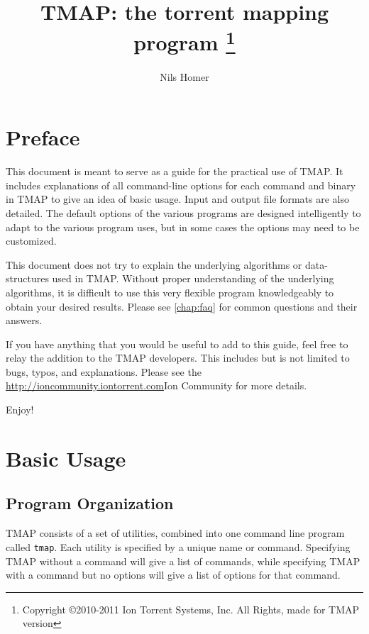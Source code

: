 \documentclass[a4paper,12pt]{book}
\author{Nils Homer}
\date{}
\title{TMAP: the torrent mapping program
\thanks{Copyright \copyright 2010-2011 Ion Torrent Systems, Inc. All Rights, made for TMAP version \Version}
}
\newcommand{\TT}[1]{{\tt #1}} %
\begin{document}
\frontmatter

\maketitle

\dominitoc
\tableofcontents
{}


\chapter{Preface}
This document is meant to serve as a guide for the practical use of TMAP.
It includes explanations of all command-line options for each command and binary in TMAP to give an idea of basic usage.
Input and output file formats are also detailed.
The default options of the various programs are designed intelligently to adapt to the various program uses, but in some cases the options may need to be customized.

This document does not try to explain the underlying algorithms or data-structures used in TMAP.
Without proper understanding of the underlying algorithms, it is difficult to use this very flexible program knowledgeably to obtain your desired results.
Please see \autoref{chap:faq} for common questions and their answers.

If you have anything that you would be useful to add to this guide, feel free to relay the addition to the TMAP developers.
This includes but is not limited to bugs, typos, and explanations.
Please see the \url{http://ioncommunity.iontorrent.com}{Ion Community} for more details.

Enjoy!

\mainmatter

\chapter{Basic Usage}

\section{Program Organization}
TMAP consists of a set of utilities, combined into one command line program called \TT{tmap}.  
Each utility is specified by a unique name or command.
Specifying TMAP without a command will give a list of commands, while specifying TMAP with a command but no options will give a list of options for that command.
\end{document}
